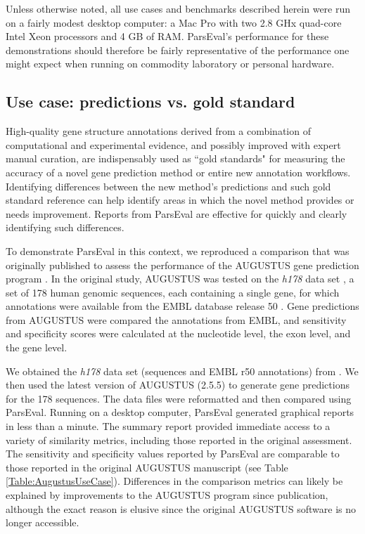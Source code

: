 Unless otherwise noted, all use cases and benchmarks described herein were run on a fairly modest desktop computer: a Mac Pro with two 2.8 GHx quad-core Intel Xeon processors and 4 GB of RAM.
ParsEval's performance for these demonstrations should therefore be fairly representative of the performance one might expect when running on commodity laboratory or personal hardware.


\subsection{Use case: predictions vs. gold standard}
High-quality gene structure annotations derived from a combination of computational and experimental evidence, and possibly improved with expert manual curation, are indispensably used as ``gold standards" for measuring the accuracy of a novel gene prediction method or entire new annotation workflows.
Identifying differences between the new method's predictions and such gold standard reference can help identify areas in which the novel method provides or needs improvement.
Reports from ParsEval are effective for quickly and clearly identifying such differences.

To demonstrate ParsEval in this context, we reproduced a comparison that was originally published to assess the performance of the AUGUSTUS gene prediction program \citep{Stanke2003}.
In the original study, AUGUSTUS was tested on the \emph{h178} data set \citep{Guigo2000}, a set of 178 human genomic sequences, each containing a single gene, for which annotations were available from the EMBL database release 50 \citep{embl}.
Gene predictions from AUGUSTUS were compared the annotations from EMBL, and sensitivity and specificity scores were calculated at the nucleotide level, the exon level, and the gene level.

We obtained the \emph{h178} data set (sequences and EMBL r50 annotations) from \citep{imim}.
We then used the latest version of AUGUSTUS (2.5.5) to generate gene predictions for the 178 sequences.
The data files were reformatted and then compared using ParsEval.
Running on a desktop computer, ParsEval generated graphical reports in less than a minute.
The summary report provided immediate access to a variety of similarity metrics, including those reported in the original assessment.
The sensitivity and specificity values reported by ParsEval are comparable to those reported in the original AUGUSTUS manuscript (see Table \ref{Table:AugustusUseCase}).
Differences in the comparison metrics can likely be explained by improvements to the AUGUSTUS program since publication, although the exact reason is elusive since the original AUGUSTUS software is no longer accessible.

